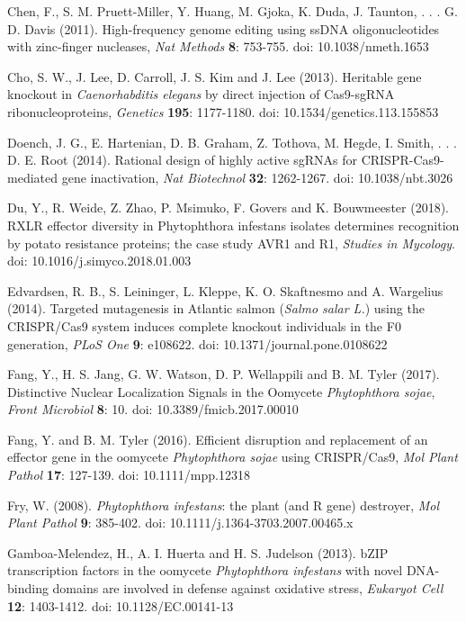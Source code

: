 \documentclass[onecolumn, 11pt,openany]{memoir}
\begin{document}
\begin{multicols}{2}
\begin{sloppy}
\begin{footnotesize}
Chen, F., S. M. Pruett-Miller, Y. Huang, M. Gjoka, K. Duda, J. Taunton, . . . G. D. Davis (2011). High-frequency genome editing using ssDNA oligonucleotides with zinc-finger nucleases, \textit{Nat Methods} \textbf{8}: 753-755. doi: 10.1038/nmeth.1653

Cho, S. W., J. Lee, D. Carroll, J. S. Kim and J. Lee (2013). Heritable gene knockout in \textit{Caenorhabditis elegans} by direct injection of Cas9-sgRNA ribonucleoproteins, \textit{Genetics} \textbf{195}: 1177-1180. doi: 10.1534/genetics.113.155853

Doench, J. G., E. Hartenian, D. B. Graham, Z. Tothova, M. Hegde, I. Smith, . . . D. E. Root (2014). Rational design of highly active sgRNAs for CRISPR-Cas9-mediated gene inactivation, \textit{Nat Biotechnol} \textbf{32}: 1262-1267. doi: 10.1038/nbt.3026

Du, Y., R. Weide, Z. Zhao, P. Msimuko, F. Govers and K. Bouwmeester (2018). RXLR effector diversity in Phytophthora infestans isolates determines recognition by potato resistance proteins; the case study AVR1 and R1, \textit{Studies in Mycology}. doi: 10.1016/j.simyco.2018.01.003

Edvardsen, R. B., S. Leininger, L. Kleppe, K. O. Skaftnesmo and A. Wargelius (2014). Targeted mutagenesis in Atlantic salmon (\textit{Salmo salar L.}) using the CRISPR/Cas9 system induces complete knockout individuals in the F0 generation, \textit{PLoS One} \textbf{9}: e108622. doi: 10.1371/journal.pone.0108622

Fang, Y., H. S. Jang, G. W. Watson, D. P. Wellappili and B. M. Tyler (2017). Distinctive Nuclear Localization Signals in the Oomycete \textit{Phytophthora sojae}, \textit{Front Microbiol} \textbf{8}: 10. doi: 10.3389/fmicb.2017.00010

Fang, Y. and B. M. Tyler (2016). Efficient disruption and replacement of an effector gene in the oomycete \textit{Phytophthora sojae} using CRISPR/Cas9, \textit{Mol Plant Pathol} \textbf{17}: 127-139. doi: 10.1111/mpp.12318

Fry, W. (2008). \textit{Phytophthora infestans}: the plant (and R gene) destroyer, \textit{Mol Plant Pathol} \textbf{9}: 385-402. doi: 10.1111/j.1364-3703.2007.00465.x

Gamboa-Melendez, H., A. I. Huerta and H. S. Judelson (2013). bZIP transcription factors in the oomycete \textit{Phytophthora infestans} with novel DNA-binding domains are involved in defense against oxidative stress, \textit{Eukaryot Cell} \textbf{12}: 1403-1412. doi: 10.1128/EC.00141-13


\end{footnotesize}
\end{sloppy}
\end{multicols}
\end{document}
